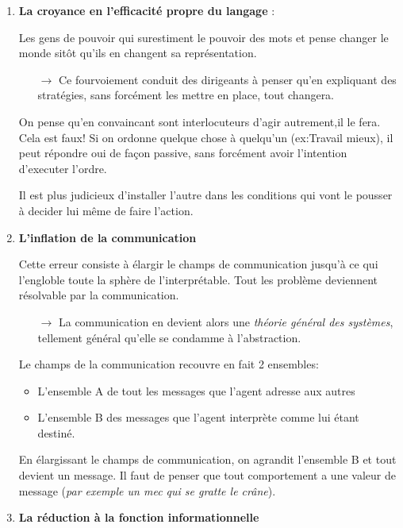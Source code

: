 \documentclass[11pt]{article} %
\begin{document}
\begin{enumerate}
\item \textbf{La croyance en l'efficacité propre du langage} :

    Les gens de pouvoir qui surestiment le pouvoir des mots et pense
    changer le monde sitôt qu'ils en changent sa représentation. 
    \begin{itemize}
        \item[$\to$] Ce fourvoiement conduit des dirigeants à penser qu'en expliquant des
    stratégies, sans forcément les mettre en place, tout changera.
    \end{itemize}

    On pense qu'en convaincant sont interlocuteurs d'agir autrement,il
    le fera. Cela est faux! Si on ordonne quelque chose à quelqu'un
    (ex:Travail mieux), il peut répondre oui de façon passive, sans
    forcément avoir l'intention d'executer l'ordre.

    Il est plus judicieux d'installer l'autre dans les conditions qui
    vont le pousser à decider lui même de faire l'action.


\item \textbf{L'inflation de la communication}

    Cette erreur consiste à élargir le champs de communication
    jusqu'à ce qui l'engloble toute la sphère de l'interprétable.
    Tout les problème deviennent résolvable par la communication.
    \begin{itemize}
        \item[$\to$] La communication en devient alors une \textit{théorie général des
    systèmes}, tellement général qu'elle se condamme à l'abstraction.
    \end{itemize}

    Le champs de la communication recouvre en fait 2 ensembles:

    \begin{itemize}
        \item L'ensemble A de tout les messages que l'agent adresse aux autres
        \item L'ensemble B des messages que l'agent interprète comme lui étant destiné. 
    \end{itemize}

    En élargissant le champs de communication, on agrandit l'ensemble B
    et tout devient un message. Il faut de penser que tout comportement
    a une valeur de message (\textit{par exemple un mec qui se gratte le
    crâne}).

 \item \textbf{La réduction à la fonction informationnelle}


\end{enumerate}
\end{document}
